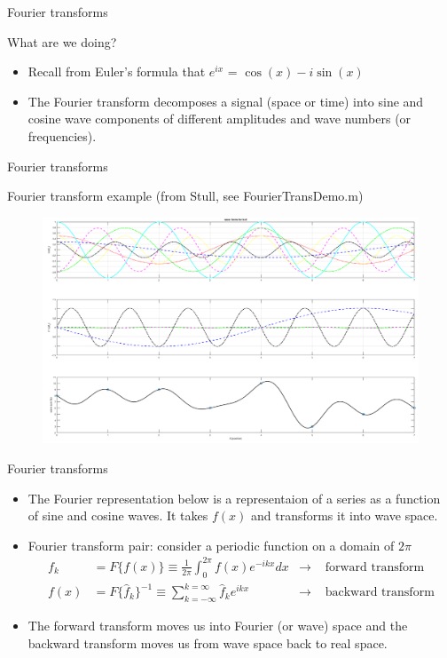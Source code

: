 \begin{frame}{Fourier transforms}

What are we doing?
\begin{itemize}
	\item Recall from Euler's formula that $e^{ix}$ = $\cos (x) - i\sin (x)$
	\item The Fourier transform decomposes a signal (space or time) into sine and cosine wave components of different amplitudes and wave numbers (or frequencies).
	\end{itemize}
\end{frame}

\begin{frame}{Fourier transforms}

Fourier transform example (from Stull, see FourierTransDemo.m)
\begin{figure}
	\includegraphics[width=\textwidth]{fourier.png}
\end{figure}
\end{frame}

\begin{frame}{Fourier transforms}

\begin{itemize}
	\item The Fourier representation below is a representaion of a series as a function of sine and cosine waves. It takes $f(x)$ and transforms it into wave space.
	\item Fourier transform pair: consider a periodic function on a domain of $2\pi$
	\begin{align*}
		f_k &= F\{f(x)\} \equiv \frac{1}{2\pi} \int^{2\pi}_{0} f(x) e^{-ikx}dx &\rightarrow & \text{ forward transform}\\
		f(x) &= F\{\hat f_k\}^{-1} \equiv \sum^{k=\infty}_{k=-\infty} \hat f_k e^{ikx} &\rightarrow & \text{ backward transform}
	\end{align*}
	\item The forward transform moves us into Fourier (or wave) space and the backward transform moves us from wave space back to real space.
	\end{itemize}
\end{frame}


